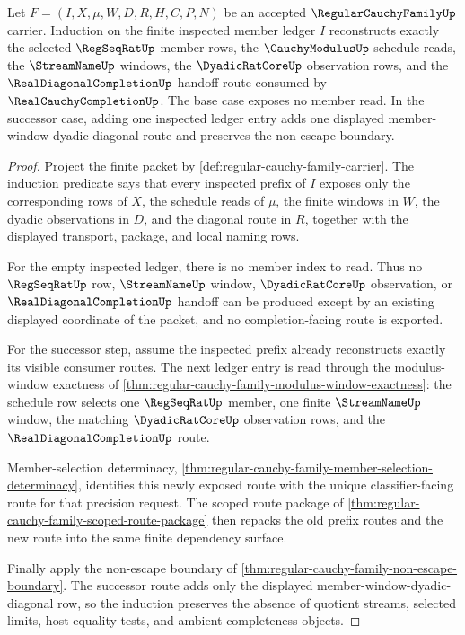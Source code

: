 \begin{theorem}
\label{thm:regular-cauchy-family-finite-induction-route}
Let $F=(I,X,\mu,W,D,R,H,C,P,N)$ be an accepted $\RegularCauchyFamilyUp$ carrier. Induction on the finite inspected member ledger $I$ reconstructs exactly the selected $\RegSeqRatUp$ member rows, the $\CauchyModulusUp$ schedule reads, the $\StreamNameUp$ windows, the $\DyadicRatCoreUp$ observation rows, and the $\RealDiagonalCompletionUp$ handoff route consumed by $\RealCauchyCompletionUp$. The base case exposes no member read. In the successor case, adding one inspected ledger entry adds one displayed member-window-dyadic-diagonal route and preserves the non-escape boundary.
\end{theorem}
\begin{proof}
Project the finite packet by \autoref{def:regular-cauchy-family-carrier}. The induction predicate says that every inspected prefix of $I$ exposes only the corresponding rows of $X$, the schedule reads of $\mu$, the finite windows in $W$, the dyadic observations in $D$, and the diagonal route in $R$, together with the displayed transport, package, and local naming rows.

For the empty inspected ledger, there is no member index to read. Thus no $\RegSeqRatUp$ row, $\StreamNameUp$ window, $\DyadicRatCoreUp$ observation, or $\RealDiagonalCompletionUp$ handoff can be produced except by an existing displayed coordinate of the packet, and no completion-facing route is exported.

For the successor step, assume the inspected prefix already reconstructs exactly its visible consumer routes. The next ledger entry is read through the modulus-window exactness of \autoref{thm:regular-cauchy-family-modulus-window-exactness}: the schedule row selects one $\RegSeqRatUp$ member, one finite $\StreamNameUp$ window, the matching $\DyadicRatCoreUp$ observation rows, and the $\RealDiagonalCompletionUp$ route.

Member-selection determinacy, \autoref{thm:regular-cauchy-family-member-selection-determinacy}, identifies this newly exposed route with the unique classifier-facing route for that precision request. The scoped route package of \autoref{thm:regular-cauchy-family-scoped-route-package} then repacks the old prefix routes and the new route into the same finite dependency surface.

Finally apply the non-escape boundary of \autoref{thm:regular-cauchy-family-non-escape-boundary}. The successor route adds only the displayed member-window-dyadic-diagonal row, so the induction preserves the absence of quotient streams, selected limits, host equality tests, and ambient completeness objects.
\end{proof}

